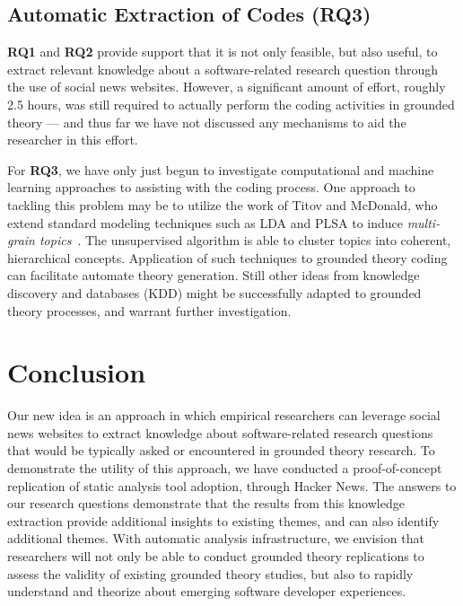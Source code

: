 \documentclass{sig-alternate}
\begin{document}


\subsection{Automatic Extraction of Codes (RQ3)}

\textbf{RQ1} and \textbf{RQ2} provide support that it is not only feasible, but also useful, to extract relevant knowledge about a software-related research question through the use of social news websites. However, a significant amount of effort, roughly 2.5 hours, was still required to actually perform the coding activities in grounded theory --- and thus far we have not discussed any mechanisms to aid the researcher in this effort.

For \textbf{RQ3}, we have only just begun to investigate computational and machine learning approaches to assisting with the coding process. One approach to tackling this problem may be to utilize the work of Titov and McDonald, who extend standard modeling techniques such as LDA and PLSA to induce \textit{multi-grain topics}~\cite{Titov2008}. The unsupervised algorithm is able to cluster topics into coherent, hierarchical concepts. Application of such techniques to grounded theory coding can facilitate automate theory generation. Still other ideas from knowledge discovery and databases (KDD) might be successfully adapted to grounded theory processes, and warrant further investigation.

\balance

\section{Conclusion}

Our new idea is an approach in which empirical researchers can leverage social news websites to extract knowledge about software-related research questions that would be typically asked or encountered in grounded theory research. To demonstrate the utility of this approach, we have conducted a proof-of-concept replication of static analysis tool adoption, through Hacker News. The answers to our research questions demonstrate that the results from this knowledge extraction provide additional insights to existing themes, and can also identify additional themes. With automatic analysis infrastructure, we envision that researchers will not only be able to conduct grounded theory replications to assess the validity of existing grounded theory studies, but also to rapidly understand and theorize about  emerging software developer experiences.
\end{document}
